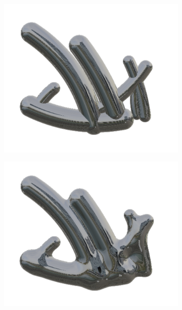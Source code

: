 \documentclass[%
reprint,
twocolumn,
nofootinbib,
 amsmath,amssymb,
 aps,
]{revtex4-2}
\begin{document}
\begin{figure}
    \begin{subfigure}{0.15\textwidth}
        \includegraphics[width=0.98\linewidth]{img/smoothness0.png}
    \end{subfigure}
    \begin{subfigure}{0.15\textwidth}
        \includegraphics[width=0.98\linewidth]{img/smoothness0.05.png}
    \end{subfigure}
    \begin{subfigure}{0.15\textwidth}

\end{subfigure}
\end{figure}
\end{document}
